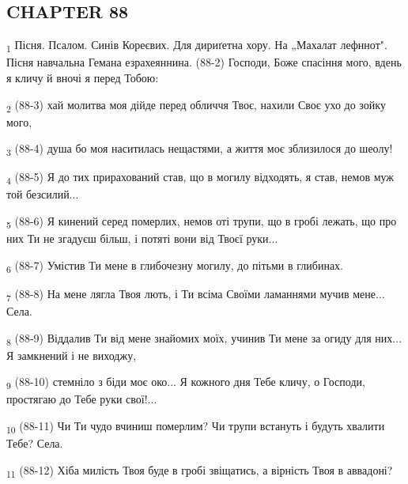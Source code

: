 \subsection{CHAPTER 88}
\begin{tcolorbox}
\textsubscript{1} Пісня. Псалом. Синів Кореєвих. Для дириґетна хору. На „Махалат лефннот". Пісня навчальна Гемана езрахеяннина. (88-2) Господи, Боже спасіння мого, вдень я кличу й вночі я перед Тобою:
\end{tcolorbox}
\begin{tcolorbox}
\textsubscript{2} (88-3) хай молитва моя дійде перед обличчя Твоє, нахили Своє ухо до зойку мого,
\end{tcolorbox}
\begin{tcolorbox}
\textsubscript{3} (88-4) душа бо моя наситилась нещастями, а життя моє зблизилося до шеолу!
\end{tcolorbox}
\begin{tcolorbox}
\textsubscript{4} (88-5) Я до тих прирахований став, що в могилу відходять, я став, немов муж той безсилий...
\end{tcolorbox}
\begin{tcolorbox}
\textsubscript{5} (88-6) Я кинений серед померлих, немов оті трупи, що в гробі лежать, що про них Ти не згадуєш більш, і потяті вони від Твоєї руки...
\end{tcolorbox}
\begin{tcolorbox}
\textsubscript{6} (88-7) Умістив Ти мене в глибочезну могилу, до пітьми в глибинах.
\end{tcolorbox}
\begin{tcolorbox}
\textsubscript{7} (88-8) На мене лягла Твоя лють, і Ти всіма Своїми ламаннями мучив мене... Села.
\end{tcolorbox}
\begin{tcolorbox}
\textsubscript{8} (88-9) Віддалив Ти від мене знайомих моїх, учинив Ти мене за огиду для них... Я замкнений і не виходжу,
\end{tcolorbox}
\begin{tcolorbox}
\textsubscript{9} (88-10) стемніло з біди моє око... Я кожного дня Тебе кличу, о Господи, простягаю до Тебе руки свої!...
\end{tcolorbox}
\begin{tcolorbox}
\textsubscript{10} (88-11) Чи Ти чудо вчиниш померлим? Чи трупи встануть і будуть хвалити Тебе? Села.
\end{tcolorbox}
\begin{tcolorbox}
\textsubscript{11} (88-12) Хіба милість Твоя буде в гробі звіщатись, а вірність Твоя в аввадоні?
\end{tcolorbox}
